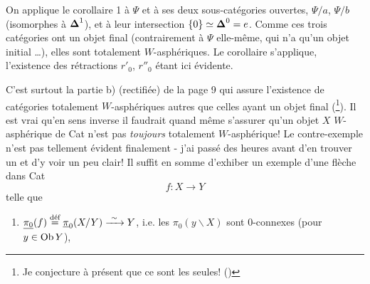 On applique le corollaire 1 à $\Psi$ et à ses deux sous-catégories ouvertes, $\Psi/a$, $\Psi/b$ (isomorphes à $\boldsymbol{\Delta}^1$), et à leur intersection $\{0\} \simeq \boldsymbol{\Delta}^0 = e$. Comme ces trois catégories ont un objet final (contrairement à $\Psi$ elle-même, qui n'a qu'un objet initial \dots), elles sont totalement $W$-asphériques. Le corollaire s'applique, l'existence des rétractions $r'_0$, $r''_0$ étant ici évidente.

C'est surtout la partie b) (rectifiée) de la page 9 qui assure l'existence de catégories totalement $W$-asphériques autres que celles ayant un objet final (\footnote{Je conjecture à présent que ce sont les seules! (\footnotemark)}). Il est vrai qu'en sens inverse il faudrait quand même s'assurer qu'un objet $X$ $W$-asphérique de Cat n'est pas \textit{toujours} totalement $W$-asphérique! Le contre-exemple n'est pas tellement évident finalement -
j'ai passé des heures avant d'en trouver un et d'y voir un peu clair! Il suffit en somme d'exhiber un exemple d'une flèche dans Cat
\[
f : X \longrightarrow Y
\]
telle que
\begin{enumerate}[label=\alph*)]
\item $\underline{\pi_0}(f) \overset{\text{déf}}{=} \underline{\pi}_0(X/Y) \xrightarrow{\ \sim\ } Y$, i.e. les $\pi_0(y\backslash X)$ sont 0-connexes (pour $y \in \mathrm{Ob}\, Y$),
\end{enumerate}


